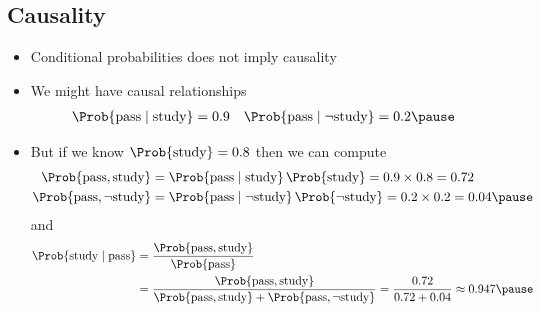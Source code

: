 \begin{slide}
\section[-2]{Causality}

\begin{PauseHighLight}
  \begin{itemize}\squeeze
  \item Conditional probabilities does not imply causality\pause
  \item We might have causal relationships
    \begin{align*}
      \Prob{\text{pass}\mid\text{study}} &= 0.9
      &
        \Prob{\text{pass}\mid \neg\text{study}} &= 0.2\pause
    \end{align*}
  \item But if we know $\Prob{\text{study}}=0.8$ then we can compute
    \begin{align*}
      \Prob{\text{pass}, \text{study}}
      &= \Prob{\text{pass}\mid\text{study}} \, \Prob{\text{study}}=
        0.9\times0.8 =0.72 \\
      \Prob{\text{pass}, \neg\text{study}}
      &= \Prob{\text{pass}\mid \neg\text{study}} \, \Prob{\neg\text{study}}=
        0.2\times0.2 =0.04\pause
    \end{align*}
    and{\small
    \begin{align*}
      \Prob{\text{study}\mid\text{pass}}
      &= \frac{\Prob{\text{pass},   \text{study}}}{\Prob{\text{pass}}} \\
      &=\frac{\Prob{\text{pass},  \text{study}}}
        {\Prob{\text{pass},\text{study}}+\Prob{\text{pass},\neg\text{study}}}
        = \frac{0.72}{0.72 + 0.04} \approx 0.947\pause
    \end{align*}}
  \end{itemize}
\end{PauseHighLight}

\end{slide}


